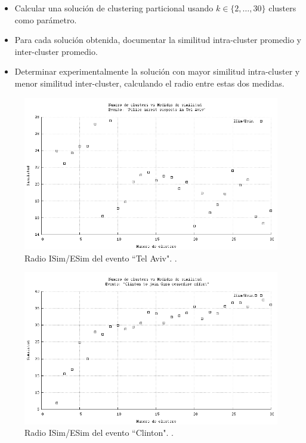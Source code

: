 \begin{itemize}
\item Calcular una solución de clustering particional usando
  $k \in \{2,\ldots,30\}$ clusters como parámetro.
\item Para cada solución obtenida, documentar la similitud intra-cluster
  promedio y inter-cluster promedio.
\item Determinar experimentalmente la solución con mayor similitud
  intra-cluster y menor similitud inter-cluster, calculando el radio
  entre estas dos medidas.
\end{itemize}
\begin{figure}[h]
  \centering
  \includegraphics[width=14cm]{./img/telaviv-clusters-radio.png}
  \caption[Radios de similitud para evento 1]
   { Radio ISim/ESim del evento ``Tel Aviv". \label{fig:telaviv-radio}. }
\end{figure}

\begin{figure}[h]
  \centering
  \includegraphics[width=14cm]{./img/clinton-clusters-radio.png}
  \caption[Radios de similitud para evento 2]
   { Radio ISim/ESim del evento ``Clinton". \label{fig:clinton-radio}. }
\end{figure}

